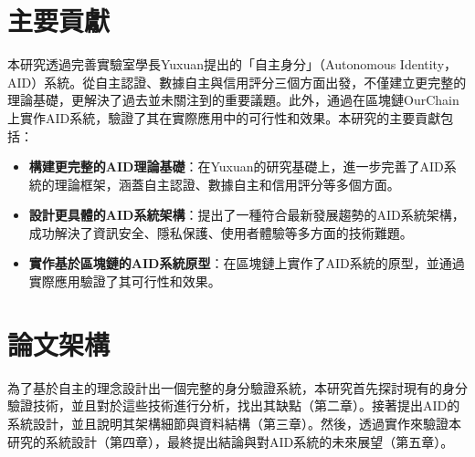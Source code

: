 \section{主要貢獻}
本研究透過完善實驗室學長Yuxuan\cite{ntu-lin2014autonomous}提出的「自主身分」（Autonomous Identity，AID）系統。從自主認證、數據自主與信用評分三個方面出發，不僅建立更完整的理論基礎，更解決了過去並未關注到的重要議題。此外，通過在區塊鏈OurChain\cite{ourlab408_ourchain}上實作AID系統，驗證了其在實際應用中的可行性和效果。本研究的主要貢獻包括：
\begin{itemize}
  \item \textbf{構建更完整的AID理論基礎}：在Yuxuan的研究基礎上，進一步完善了AID系統的理論框架，涵蓋自主認證、數據自主和信用評分等多個方面。
  \item \textbf{設計更具體的AID系統架構}：提出了一種符合最新發展趨勢的AID系統架構，成功解決了資訊安全、隱私保護、使用者體驗等多方面的技術難題。
  \item \textbf{實作基於區塊鏈的AID系統原型}：在區塊鏈上實作了AID系統的原型，並通過實際應用驗證了其可行性和效果。
\end{itemize}
\section{論文架構}
為了基於自主的理念設計出一個完整的身分驗證系統，本研究首先探討現有的身分驗證技術，並且對於這些技術進行分析，找出其缺點（第二章）。接著提出AID的系統設計，並且說明其架構細節與資料結構（第三章）。然後，透過實作來驗證本研究的系統設計（第四章），最終提出結論與對AID系統的未來展望（第五章）。